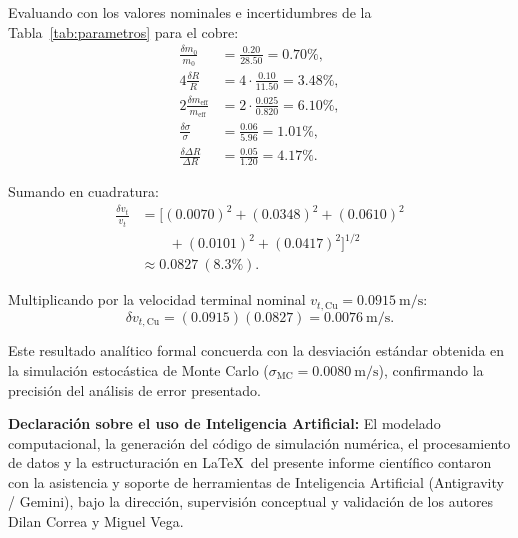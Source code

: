 \documentclass[aps,prb,reprint,twocolumn,superscriptaddress,amsmath,amssymb,floatfix]{revtex4-2}
\begin{document}
Evaluando con los valores nominales e incertidumbres de la Tabla~\ref{tab:parametros} para el cobre:
\begin{align*}
\frac{\delta m_0}{m_0} &= \frac{0.20}{28.50} = 0.70\%, \\
4\frac{\delta R}{R} &= 4 \cdot \frac{0.10}{11.50} = 3.48\%, \\
2\frac{\delta m_{\mathrm{eff}}}{m_{\mathrm{eff}}} &= 2 \cdot \frac{0.025}{0.820} = 6.10\%, \\
\frac{\delta \sigma}{\sigma} &= \frac{0.06}{5.96} = 1.01\%, \\
\frac{\delta \Delta R}{\Delta R} &= \frac{0.05}{1.20} = 4.17\%.
\end{align*}

Sumando en cuadratura:
\begin{align}
\frac{\delta v_t}{v_t} &= \Big[ (0.0070)^2 + (0.0348)^2 + (0.0610)^2 \nonumber \\
&\qquad + (0.0101)^2 + (0.0417)^2 \Big]^{1/2} \nonumber \\
&\approx 0.0827\ (8.3\%). \label{eq:resultado_incertidumbre}
\end{align}

Multiplicando por la velocidad terminal nominal $v_{t,\mathrm{Cu}} = 0.0915\ \mathrm{m/s}$:
\begin{equation}
\delta v_{t,\mathrm{Cu}} = (0.0915)(0.0827) = 0.0076\ \mathrm{m/s}.
\label{eq:dvt_nominal}
\end{equation}

Este resultado analítico formal concuerda con la desviación estándar obtenida en la simulación estocástica de Monte Carlo ($\sigma_{\mathrm{MC}} = 0.0080\ \mathrm{m/s}$), confirmando la precisión del análisis de error presentado.

\begin{acknowledgments}
\textbf{Declaración sobre el uso de Inteligencia Artificial:} El modelado computacional, la generación del código de simulación numérica, el procesamiento de datos y la estructuración en \LaTeX\ del presente informe científico contaron con la asistencia y soporte de herramientas de Inteligencia Artificial (Antigravity / Gemini), bajo la dirección, supervisión conceptual y validación de los autores Dilan Correa y Miguel Vega.
\end{acknowledgments}


\end{document}
